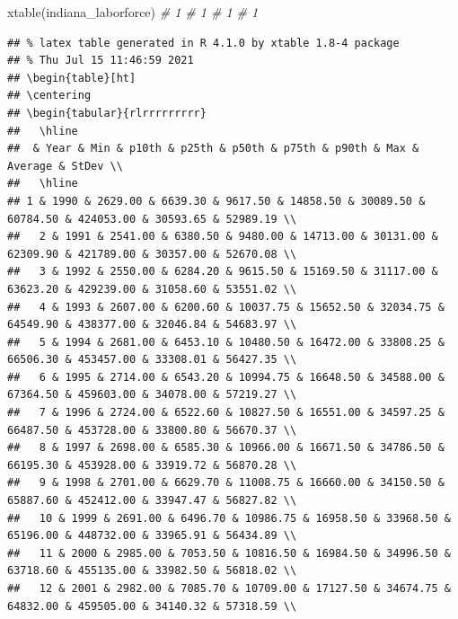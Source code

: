 \documentclass[
]{book}
\newenvironment{Shaded}{\begin{snugshade}}{\end{snugshade}}
\newcommand{\CommentTok}[1]{\textcolor[rgb]{0.56,0.35,0.01}{\textit{#1}}}
\newcommand{\FunctionTok}[1]{\textcolor[rgb]{0.00,0.00,0.00}{#1}}
\newcommand{\NormalTok}[1]{#1}
\begin{document}
\begin{Shaded}
\begin{Highlighting}[]
  \FunctionTok{xtable}\NormalTok{(indiana\_laborforce)  }\CommentTok{\# 1  \# 1  \# 1  \# 1}
\end{Highlighting}
\end{Shaded}

\begin{verbatim}
## % latex table generated in R 4.1.0 by xtable 1.8-4 package
## % Thu Jul 15 11:46:59 2021
## \begin{table}[ht]
## \centering
## \begin{tabular}{rlrrrrrrrrr}
##   \hline
##  & Year & Min & p10th & p25th & p50th & p75th & p90th & Max & Average & StDev \\ 
##   \hline
## 1 & 1990 & 2629.00 & 6639.30 & 9617.50 & 14858.50 & 30089.50 & 60784.50 & 424053.00 & 30593.65 & 52989.19 \\ 
##   2 & 1991 & 2541.00 & 6380.50 & 9480.00 & 14713.00 & 30131.00 & 62309.90 & 421789.00 & 30357.00 & 52670.08 \\ 
##   3 & 1992 & 2550.00 & 6284.20 & 9615.50 & 15169.50 & 31117.00 & 63623.20 & 429239.00 & 31058.60 & 53551.02 \\ 
##   4 & 1993 & 2607.00 & 6200.60 & 10037.75 & 15652.50 & 32034.75 & 64549.90 & 438377.00 & 32046.84 & 54683.97 \\ 
##   5 & 1994 & 2681.00 & 6453.10 & 10480.50 & 16472.00 & 33808.25 & 66506.30 & 453457.00 & 33308.01 & 56427.35 \\ 
##   6 & 1995 & 2714.00 & 6543.20 & 10994.75 & 16648.50 & 34588.00 & 67364.50 & 459603.00 & 34078.00 & 57219.27 \\ 
##   7 & 1996 & 2724.00 & 6522.60 & 10827.50 & 16551.00 & 34597.25 & 66487.50 & 453728.00 & 33800.80 & 56670.37 \\ 
##   8 & 1997 & 2698.00 & 6585.30 & 10966.00 & 16671.50 & 34786.50 & 66195.30 & 453928.00 & 33919.72 & 56870.28 \\ 
##   9 & 1998 & 2701.00 & 6629.70 & 11008.75 & 16660.00 & 34150.50 & 65887.60 & 452412.00 & 33947.47 & 56827.82 \\ 
##   10 & 1999 & 2691.00 & 6496.70 & 10986.75 & 16958.50 & 33968.50 & 65196.00 & 448732.00 & 33965.91 & 56434.89 \\ 
##   11 & 2000 & 2985.00 & 7053.50 & 10816.50 & 16984.50 & 34996.50 & 63718.60 & 455135.00 & 33982.50 & 56818.02 \\ 
##   12 & 2001 & 2982.00 & 7085.70 & 10709.00 & 17127.50 & 34674.75 & 64832.00 & 459505.00 & 34140.32 & 57318.59 \\ 

\end{verbatim}
\end{document}
